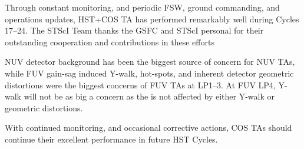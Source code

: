 Through constant monitoring, and periodic FSW, ground commanding, and operations updates,
HST+COS TA has performed remarkably well during Cycles 17--24. The STScI Team thanks the
GSFC and STScI personal for their outstanding cooperation and contributions in these efforts

NUV detector background has been the biggest source of concern
for NUV TAs, while FUV gain-sag induced Y-walk, hot-spots, and inherent detector geometric distortions
were the biggest concerns of FUV TAs at LP1--3. At FUV LP4, Y-walk will not be as big a concern as
the \numposone{}  is not affected by either Y-walk or geometric distortions.

With continued monitoring, and occasional corrective actions, COS TAs should continue their excellent performance
in future HST Cycles.
